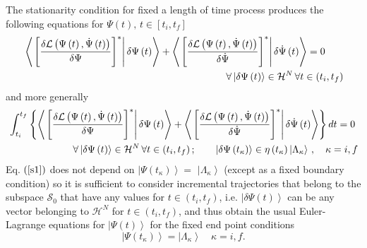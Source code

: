 \documentclass[aps,preprint]{revtex4}
\begin{document}
The stationarity condition for fixed a length of time process produces the
following equations for $\Psi\left( t\right) ,\,t\in\left[ t_{i},t_{f}\right]
$ 
\begin{align}
& \left\langle \left. \left[ \frac{\delta\mathcal{L}\left( \Psi\left(
t\right) ,\dot{\Psi}\left( t\right) \right) }{\delta\Psi}\right] ^{\ast
}\right| \delta\Psi\left( t\right) \right\rangle +\left\langle \left. \left[ 
\frac{\delta\mathcal{L}\left( \Psi\left( t\right) ,\dot{\Psi }\left(
t\right) \right) }{\delta\dot{\Psi}}\right] ^{\ast}\right| \delta\dot{\Psi}%
\left( t\right) \right\rangle =0  \notag \\
& \left. {}\right. \qquad\qquad\qquad\qquad\qquad\qquad\qquad\qquad
\qquad\qquad\forall\left| \delta\Psi\left( t\right) \right\rangle \in%
\mathcal{H}^{N}\,\forall t\in\left( t_{i},t_{f}\right)  \label{s1}
\end{align}
and more generally 
\begin{align}
& \int_{t_{i}}^{t_{f}}\left\{ \left\langle \left. \left[ \frac {\delta%
\mathcal{L}\left( \Psi\left( t\right) ,\dot{\Psi}\left( t\right) \right) }{%
\delta\Psi}\right] ^{\ast}\right| \delta\Psi\left( t\right) \right\rangle
+\left\langle \left. \left[ \frac{\delta\mathcal{L}\left( \Psi\left(
t\right) ,\dot{\Psi}\left( t\right) \right) }{\delta\dot{\Psi }}\right]
^{\ast}\right| \delta\dot{\Psi}\left( t\right) \right\rangle \right\} dt=0 
\notag \\
& \left. {}\right. \qquad\qquad\qquad\forall\left| \delta\Psi\left( t\right)
\right\rangle \in\mathcal{H}^{N}\,\forall t\in\left( t_{i},t_{f}\right)
;\qquad\left| \delta\Psi\left( t_{\kappa}\right) \right\rangle \in\mathcal{%
\eta}\left( t_{\kappa}\right) \left| \Lambda_{\kappa}\right\rangle
\,,\quad\kappa=i,f  \label{s2}
\end{align}
Eq. $\left( \ref{s1}\right) $ does not depend on $\left| \Psi\left(
t_{\kappa}\right) \right\rangle =$ $\left| \Lambda_{\kappa}\right\rangle $
(except as a fixed boundary condition) so it is sufficient to consider
incremental trajectories that belong to the subspace $\mathcal{S}_{0}$ that
have any values for $t\in\left( t_{i},t_{f}\right) $, i.e. $\left|
\delta\Psi\left( t\right) \right\rangle $ can be any vector belonging to $%
\mathcal{H}^{N}$ for $t\in\left( t_{i},t_{f}\right) $, and thus obtain the
usual Euler-Lagrange equations for $\left| \Psi\left( t\right) \right\rangle 
$ for the fixed end point conditions 
\begin{equation}
\left| \Psi\left( t_{\kappa}\right) \right\rangle =\left| \Lambda_{\kappa
}\right\rangle \quad\kappa=i,f.
\end{equation}
\end{document}
